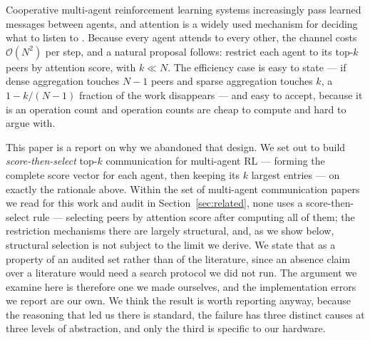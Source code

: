 Cooperative multi-agent reinforcement learning systems increasingly pass
learned messages between agents, and attention is a widely used mechanism for
deciding what to listen to \citep{das2019tarmac,jiang2018atoc,jiang2018dgn}.
Because every agent attends to every other, the channel costs
$\mathcal{O}(N^2)$ per step, and a natural proposal follows: restrict each
agent to its top-$k$ peers by attention score, with $k \ll N$. The efficiency
case is easy to state --- if dense aggregation touches $N-1$ peers and sparse
aggregation touches $k$, a $1 - k/(N-1)$ fraction of the work disappears --- and
easy to accept, because it is an operation count and operation counts are cheap
to compute and hard to argue with.

This paper is a report on why we abandoned that design. We set out to build
\emph{score-then-select} top-$k$ communication for multi-agent RL --- forming
the complete score vector for each agent, then keeping its $k$ largest entries
--- on exactly the rationale
above. Within the set of multi-agent communication papers we read for this work
and audit in Section~\ref{sec:related}, none uses a score-then-select rule ---
selecting peers by attention score after computing all of them; the restriction
mechanisms there are largely structural, and, as we show below,
structural selection is not subject to the limit we derive. We state that as a
property of an audited set rather than of the literature, since an absence
claim over a literature would need a search protocol we did not run. The argument we
examine here is therefore one we made ourselves, and the implementation errors
we report are our own. We think the result is worth reporting anyway, because
the reasoning that led us there is standard, the failure has three distinct
causes at three levels of abstraction, and only the third is specific to our
hardware.

